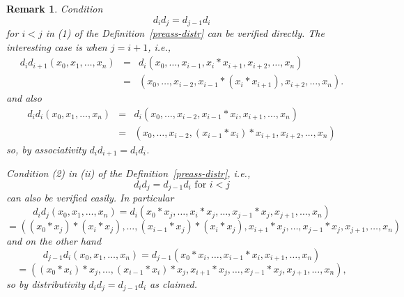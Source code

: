 \documentclass[12pt]{amsart}
\newtheorem{remark}[theorem]{Remark}
\begin{document}
\begin{remark}
\label{rem:Cond_1}
Condition
\begin{equation*}
d_{i}d_{j}=d_{j-1}d_{i}
\end{equation*}%
for $i<j$ in (1) of the Definition~\ref{preass-distr} can be verified directly. The interesting case is when $j=i+1$, i.e.,
\begin{eqnarray*}
d_{i}d_{i+1}\left( x_{0},x_{1},\ldots ,x_{n}\right) &=&d_{i}(x_{0},\ldots
,x_{i-1},x_{i}\ast x_{i+1},x_{i+2},\ldots ,x_{n}) \\
&=&(x_{0},\ldots ,x_{i-2},x_{i-1}\ast (x_{i}\ast x_{i+1}),x_{i+2},\ldots
,x_{n}).
\end{eqnarray*}
and also 
\begin{eqnarray*}
d_{i}d_{i}(x_{0},x_{1},\ldots ,x_{n}) &=&d_{i}\left( x_{0},\ldots
,x_{i-2},x_{i-1}\ast x_{i},x_{i+1},\ldots ,x_{n}\right) \\
&=&(x_{0},\ldots ,x_{i-2},(x_{i-1}\ast x_{i})\ast x_{i+1},x_{i+2},\ldots
,x_{n})
\end{eqnarray*}
so, by associativity $d_{i}d_{i+1}=d_{i}d_{i}$.

Condition (2) in (ii) of the Definition~\ref{preass-distr}, i.e., 
\begin{equation*}
d_{i}d_{j}=d_{j-1}d_{i}\text{ for }i<j
\end{equation*}%
can also be verified easily. In particular 
\begin{equation*}
d_{i}d_{j}(x_{0},x_{1},\ldots ,x_{n})=d_{i}(x_{0}\ast x_{j},\ldots
,x_{i}\ast x_{j},\ldots ,x_{j-1}\ast x_{j},x_{j+1},\ldots ,x_{n})
\end{equation*}
\begin{equation*}
=((x_{0}\ast x_{j})\ast (x_{i}\ast x_{j}),\ldots ,(x_{i-1}\ast x_{j})\ast
(x_{i}\ast x_{j}),x_{i+1}\ast x_{j},\ldots ,x_{j-1}\ast x_{j},x_{j+1},\ldots
,x_{n})
\end{equation*}
and on the other hand 
\begin{equation*}
d_{j-1}d_{i}(x_{0},x_{1},\ldots ,x_{n})=d_{j-1}(x_{0}\ast x_{i},\ldots
,x_{i-1}\ast x_{i},x_{i+1},\ldots ,x_{n})
\end{equation*}
\begin{equation*}
=((x_{0}\ast x_{i})\ast x_{j},\ldots ,(x_{i-1}\ast x_{i})\ast
x_{j},x_{i+1}\ast x_{j},\ldots ,x_{j-1}\ast x_{j},x_{j+1},\ldots ,x_{n}),
\end{equation*}
so by distributivity $d_{i}d_{j}=d_{j-1}d_{i}$ as claimed.
\end{remark}
\end{document}
